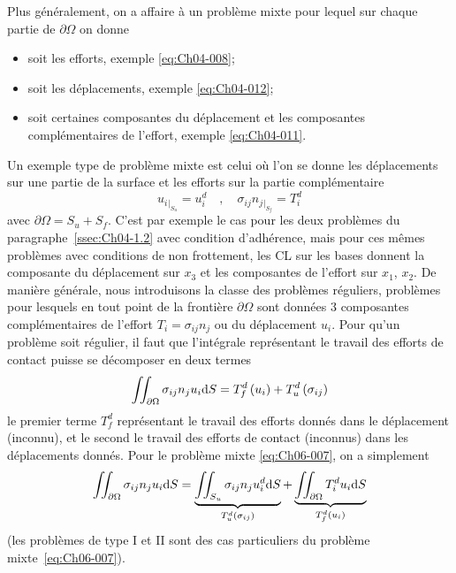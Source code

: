 Plus généralement, on a affaire à un problème mixte pour lequel sur chaque partie de $\partial \Omega$ on donne
\begin{itemize}
    \item soit les efforts, exemple \eqref{eq:Ch04-008}; 
    \item soit les déplacements, exemple \eqref{eq:Ch04-012};
    \item soit certaines composantes du déplacement et les composantes complémentaires de l'effort, exemple \eqref{eq:Ch04-011}.
\end{itemize}

Un exemple type de problème mixte est celui où l'on se donne les déplacements sur une partie de la surface et les efforts sur la partie complémentaire
\begin{equation}
    u_i{}_{|_{S_u}} =  u_i^d \quad, \quad \sigma_{ij} n_j{}_{|_{S_f}} = T_i^d
    \label{eq:Ch06-007}
\end{equation}
avec $\partial \Omega = S_u + S_f$.
C'est par exemple le cas pour les deux problèmes du paragraphe~\ref{ssec:Ch04-1.2} avec condition d'adhérence, mais pour ces mêmes problèmes avec conditions de non frottement, les CL sur les bases donnent la composante du déplacement sur $x_3$ et les composantes de l'effort sur $x_1$, $x_2$.
De manière générale, nous introduisons la classe des problèmes réguliers, problèmes pour lesquels en tout point de la frontière $\partial \Omega$ sont données 3 composantes complémentaires de l'effort $T_i = \sigma_{ij} n_j$ ou du déplacement $u_i$.
Pour qu'un problème soit régulier, il faut que l'intégrale représentant le travail des efforts de contact puisse se décomposer en deux termes
\begin{equation}
    \iint_{\partial \Omega} \sigma_{ij} n_j u_i \mathrm{d} S = T_f^d \left( u_i \right) + T_u^d \left( \sigma_{ij} \right)
    \label{eq:Ch06-008}
\end{equation}
le premier terme $T_f^d$ représentant le travail des efforts donnés dans le déplacement (inconnu), et le second le travail des efforts de contact (inconnus) dans les déplacements donnés.
Pour le problème mixte \eqref{eq:Ch06-007}, on a simplement
\begin{equation}
    \iint_{\partial \Omega} \sigma_{ij} n_j u_i \mathrm{d} S = \underbrace{\iint_{S_u} \sigma_{ij} n_j u_i^d \mathrm{d} S}_{T_u^d\left( \sigma_{ij} \right)} +  \underbrace{\iint_{\partial \Omega} T_i^d u_i \mathrm{d} S}_{T_f^d\left( u_i \right)}
    \label{eq:Ch06-009}
\end{equation}
(les problèmes de type I et II sont des cas particuliers du problème mixte~\eqref{eq:Ch06-007}).
